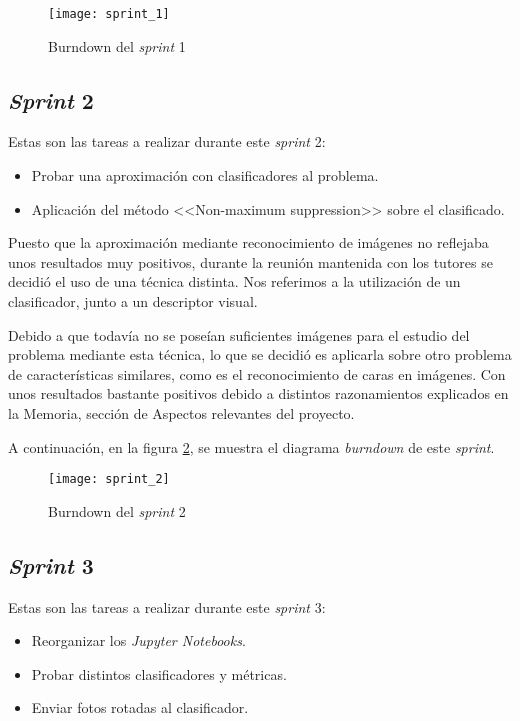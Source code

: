 \begin{figure}
\centering
\texttt{[image: sprint\_1]}
\caption{Burndown del \textit{sprint} 1}
\label{fig:A.1.2}
\end{figure}

\subsection{\textit{Sprint} 2}
Estas son las tareas a realizar durante este \textit{sprint} 2:

\begin{itemize}
	\item Probar una aproximación con clasificadores al problema.
	\item Aplicación del método <<Non-maximum suppression>> sobre el clasificado.
\end{itemize}

Puesto que la aproximación mediante reconocimiento de imágenes no reflejaba unos resultados muy positivos, durante la reunión mantenida con los tutores se decidió el uso de una técnica distinta. Nos referimos a la utilización  de un clasificador, junto a un descriptor visual.

Debido a que todavía no se poseían suficientes imágenes para el estudio del problema mediante esta técnica, lo que se decidió es aplicarla sobre otro problema de características similares, como es el reconocimiento de caras en imágenes. Con unos resultados bastante positivos debido a distintos razonamientos explicados en la Memoria, sección de Aspectos relevantes del proyecto.

A continuación, en la figura \ref{fig:A.1.3}, se muestra el diagrama \textit{burndown} de este \textit{sprint}.

\begin{figure}
\centering
\texttt{[image: sprint\_2]}
\caption{Burndown del \textit{sprint} 2}
\label{fig:A.1.3}
\end{figure}

\subsection{\textit{Sprint} 3}
Estas son las tareas a realizar durante este \textit{sprint} 3:

\begin{itemize}
	\item Reorganizar los \textit{Jupyter Notebooks}.
	\item Probar distintos clasificadores y métricas.
	\item Enviar fotos rotadas al clasificador.
\end{itemize}

